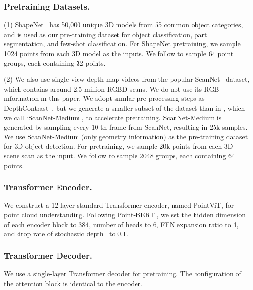 \documentclass[runningheads]{llncs}
\begin{document}
\vspace{-10pt}
\subsubsection{Pretraining Datasets.} \label{sec:datasets}
(1) ShapeNet~\cite{chang2015shapenet} has 50,000 unique 3D models from 55 common object categories, and is used as our pre-training dataset for object classification, part segmentation, and few-shot classification.  For ShapeNet pretraining, we sample 1024 points from each 3D model as the inputs.  We follow \cite{yu2021point} to sample 64 point groups, each containing 32 points.

(2) We also use single-view depth map videos from the popular ScanNet~\cite{dai2017scannet} dataset, which contains around 2.5 million RGBD scans.  We do not use its RGB information in this paper.
We adopt similar pre-processing steps as DepthContrast~\cite{Zhang_2021_ICCV}, but we generate a smaller subset of the dataset than in \cite{Zhang_2021_ICCV}, which we call `ScanNet-Medium', to accelerate pretraining.  ScanNet-Medium is generated by sampling every 10-th frame from ScanNet, resulting in 25k samples. We use ScanNet-Medium (only geometry information) as the pre-training dataset for 3D object detection.  For pretraining, we sample 20k points from each 3D scene scan as the input.  We follow \cite{misra2021-3detr} to sample 2048 groups, each containing 64 points.

\vspace{-10pt}
\subsubsection{Transformer Encoder.}  We construct a 12-layer standard Transformer encoder, named PointViT, for point cloud understanding.  Following Point-BERT \cite{yu2021point}, we set the hidden dimension of each encoder block to 384, number of heads to 6, FFN expansion ratio to 4, and drop rate of stochastic depth~\cite{huang2016deep} to 0.1.

\vspace{-10pt}
\subsubsection{Transformer Decoder.}  We use a single-layer Transformer decoder for  pretraining.  The configuration of the attention block is identical to the encoder.

\vspace{-10pt}
\end{document}
